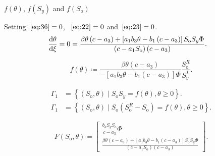 \documentclass[
    8pt,
    aspectratio=1610,
    c,
    intlimits,
    leqno,
    professionalfonts,
]{beamer}
\begin{document}
\begin{frame}
	\frametitle{\secname}

	\begin{block}{$f\left(\theta\right)$,
			$f\left(S_{y}\right)$ and $f\left(S_{\text{o}}\right)$}

		Setting~$\eqref{eq:36}=0$, ~$\eqref{eq:22}=0$
		and~$\eqref{eq:23}=0$.
		\begin{align*}
			\diff{\theta}{\xi}=
			0
			 & =
			\frac{
				\beta\theta
				\left(c-a_{3}\right)+
				\left[
					a_{1}
					b_{3}
					\theta-
					b_{1}
					\left(c-a_{3}\right)
					\right]
				S_{\text{o}}
				S_{y}
				\Phi}{
				\left(c-a_{1}S_{\text{o}}\right)
				\left(c-a_{3}\right)
			}.
		\end{align*}

		\begin{equation*}
			f\left(\theta\right)\coloneqq
			\frac{
				\beta\theta\left(c-a_{3}\right)}{
				-\left[
					a_{1}
					b_{3}
					\theta-
					b_{1}
					\left(c-a_{3}\right)
					\right]
				\Phi
			}
			\frac{S^{R}_{\text{o}}}{S^{L}_{y}}.
		\end{equation*}

		\begin{align*}
			\Gamma_{1} & =
			\left\{
			\left(S_{\text{o}},\theta\right)\mid
			S_{\text{o}}
			S_{y}=
			f\left(\theta\right),\theta\geq0
			\right\}.      \\
			\Gamma_{1} & =
			\left\{
			\left(S_{\text{o}},\theta\right)\mid
			S_{\text{o}}
			\left(
			S^{R}_{\text{o}}-
			S_{\text{o}}
			\right)=
			f\left(\theta\right),\theta\geq0
			\right\}.
		\end{align*}

		\begin{equation*}
			F\left(S_{\text{o}},\theta\right)=
			\begin{bmatrix}
				\frac{b_{3}S_{y}S_{\text{o}}}{c-a_{3}}\Phi \\
				\frac{
					\beta\theta
					\left(c-a_{3}\right)+
					\left[
						a_{1}
						b_{3}
						\theta-
						b_{1}
						\left(c-a_{3}\right)
						\right]
					S_{\text{o}}
					S_{y}
					\Phi}{
					\left(c-a_{1}S_{\text{o}}\right)
					\left(c-a_{3}\right)
				}
			\end{bmatrix}.
		\end{equation*}


\end{block}
\end{frame}
\end{document}
